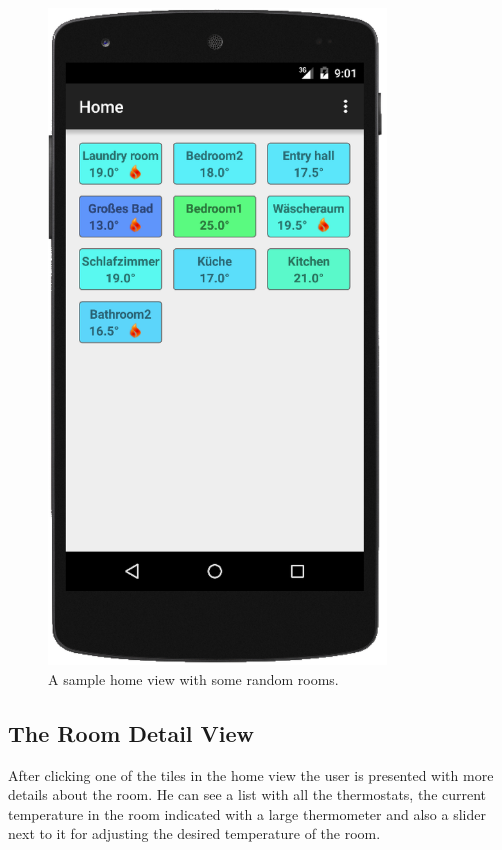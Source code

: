 \begin{figure}
	\begin{center}
		\includegraphics[width=0.8\textwidth]{images/home_view.png}
	\end{center}
	\caption{A sample home view with some random rooms.}
	\label{fig:home_view}
\end{figure}

\subsection{The Room Detail View}
\label{sec:detail_view}
After clicking one of the tiles in the home view the user is presented with more details about the room. He can see a list with all the thermostats, the current temperature in the room indicated with a large thermometer and also a slider next to it for adjusting the desired temperature of the room.

